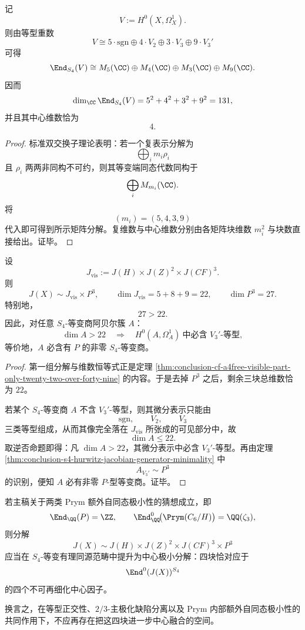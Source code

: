 \begin{theorem}\label{thm:conclusion-s4-hurwitz-differential-endomorphism-algebra-dimension}
记
\[
V:=H^0(X,\Omega_X^1).
\]
则由等型重数
\[
V\cong 5\cdot \mathrm{sgn}\oplus 4\cdot V_2\oplus 3\cdot V_3\oplus 9\cdot V_3'
\]
可得
\[
\End_{S_4}(V)
\cong
M_5(\CC)\oplus M_4(\CC)\oplus M_3(\CC)\oplus M_9(\CC).
\]
因而
\[
\dim_{\CC}\End_{S_4}(V)=5^2+4^2+3^2+9^2=131,
\]
并且其中心维数恰为
\[
4.
\]
\end{theorem}
\begin{proof}
标准双交换子理论表明：若一个复表示分解为
\[
\bigoplus_i m_i\rho_i
\]
且 \(\rho_i\) 两两非同构不可约，则其等变端同态代数同构于
\[
\bigoplus_i M_{m_i}(\CC).
\]
将
\[
(m_i)=(5,4,3,9)
\]
代入即可得到所示矩阵分解。复维数与中心维数分别由各矩阵块维数 \(m_i^2\) 与块数直接给出。证毕。
\end{proof}

\begin{theorem}\label{thm:conclusion-s4-hurwitz-prym-majority-block-large-quotient-forcing}
设
\[
J_{\mathrm{vis}}:=J(H)\times J(Z)^2\times J(CF)^3.
\]
则
\[
J(X)\sim J_{\mathrm{vis}}\times P^3,
\qquad
\dim J_{\mathrm{vis}}=5+8+9=22,
\qquad
\dim P^3=27.
\]
特别地，
\[
27>22.
\]
因此，对任意 \(S_4\)-等变商阿贝尔簇 \(A\)：
\[
\dim A>22
\quad\Longrightarrow\quad
H^0(A,\Omega_A^1)\ \text{中必含 }V_3'\text{-等型},
\]
等价地，\(A\) 必含有 \(P\) 的非零 \(S_4\)-等变商。
\end{theorem}
\begin{proof}
第一组分解与维数恒等式正是定理 \ref{thm:conclusion-cf-a4free-visible-part-only-twenty-two-over-forty-nine} 的内容。于是去掉 \(P^3\) 之后，剩余三块总维数恰为 \(22\)。

若某个 \(S_4\)-等变商 \(A\) 不含 \(V_3'\)-等型，则其微分表示只能由
\[
\mathrm{sgn},\qquad V_2,\qquad V_3
\]
三类等型组成，从而其像完全落在 \(J_{\mathrm{vis}}\) 所张成的可见部分中，故
\[
\dim A\le 22.
\]
取逆否命题即得：凡 \(\dim A>22\)，其微分表示中必含 \(V_3'\)-等型。再由定理 \ref{thm:conclusion-s4-hurwitz-jacobian-generator-minimality} 中
\[
A_{V_3'}\sim P^3
\]
的识别，便知 \(A\) 必有非零 \(P\)-型等变商。证毕。
\end{proof}

\begin{conjecture}[四块分解的中心极小性]\label{conj:conclusion-s4-hurwitz-jacobian-central-minimality}
若主稿关于两类 Prym 额外自同态极小性的猜想成立，即
\[
\End_{\QQ}(P)=\ZZ,
\qquad
\End^0_{\QQ}\!\bigl(\Prym(C_6/H)\bigr)=\QQ(\zeta_3),
\]
则分解
\[
J(X)\sim J(H)\times J(Z)^2\times J(CF)^3\times P^3
\]
应当在 \(S_4\)-等变有理同源范畴中提升为中心极小分解：四块恰对应于
\[
\End^0(J(X))^{S_4}
\]
的四个不可再细化中心因子。

换言之，在等型正交性、\(2/3\)-主极化缺陷分离以及 Prym 内部额外自同态极小性的共同作用下，不应再存在把这四块进一步中心融合的空间。
\end{conjecture}
